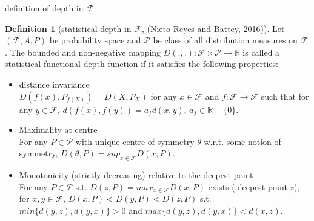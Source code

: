 \documentclass[aspectratio=169,ignorenonframetext,9pt]{beamer}
\theoremstyle{plain}
\theoremstyle{definition}
\newtheorem{defn}{Definition}[section]
\begin{document}
\begin{frame}{definition of depth in $\mathcal{F}$}
    \begin{defn}[statistical depth in $\mathcal{F}$, (Nieto-Reyes and Battey, 2016)]
        Let $(\mathcal{F},A,P)$ be probability space and $\mathcal{P}$ be class of all distribution measures on $\mathcal{F}$.
        The bounded and non-negative mapping $D(.,.): \mathcal{F}\times \mathcal{P} \rightarrow \mathbb{R}$ is called
        a statistical functional depth function if it satisfies the following properties:
        \begin{itemize}
            \item distance invariance \\
                $D(f(x),P_{f(X)})=D(X,P_X)$ for any $x\in\mathcal{F}$ and $f:\mathcal{F}\rightarrow\mathcal{F}$
                such that for any $y\in\mathcal{F}$, $d(f(x),f(y))=a_fd(x,y)$, $a_f\in\mathbb{R}-\{0\}$.
            \item Maximality at centre \\
                For any $P\in\mathcal{P}$ with unique centre of symmetry 
                $\theta$ w.r.t. some notion of symmetry, 
                $D(\theta,P)=sup_{x\in\mathcal{F}}D(x,P)$.
            \item Monotonicity (strictly decreasing) relative to the deepest point \\
                For any $P \in \mathcal{P}$ s.t. $D(z,P)=max_{x\in\mathcal{F}}D(x,P)$ exists (:deepest point $z$), 
                for $x,y\in\mathcal{F}$, $D(x,P)<D(y,P)<D(z,P)$ s.t. $min\{d(y,z),d(y,x)\}>0$ and $max\{d(y,z), d(y,x)\}<d(x,z)$.
            
        \end{itemize}
        \end{defn}
\end{frame}
\end{document}
